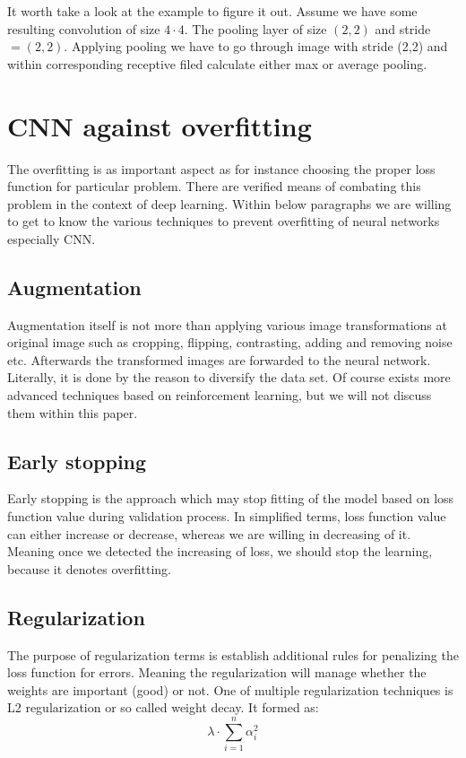 It worth take a look at the example to figure it out. Assume we have some resulting convolution of size $4 \cdot 4$. The pooling layer of size $(2, 2)$ and stride $ = (2, 2)$. 
Applying pooling we have to go through image with stride (2,2) and within corresponding receptive filed calculate either max or average pooling.  

\section{CNN against overfitting}
The overfitting is as important aspect as for instance choosing the proper loss function for particular problem. There are verified means of combating this problem in the context of deep learning. Within below paragraphs we are willing to get to know the various techniques to prevent overfitting of neural networks especially CNN. 

\subsection{Augmentation}
Augmentation itself is not more than applying various image transformations at original image such as cropping, flipping, contrasting, adding and removing noise etc. Afterwards the transformed images are forwarded to the neural network. Literally, it is done by the reason to diversify the data set. Of course exists more advanced techniques based on reinforcement learning, but we will not discuss them within this paper.      

\subsection{Early stopping}
Early stopping is the approach which may stop fitting of the model based on loss function value during validation process. In simplified terms, loss function value can either increase or decrease, whereas we are willing in decreasing of it. Meaning once we detected the increasing of loss, we should stop the learning, because it denotes overfitting.      

\subsection{Regularization}
The purpose of regularization terms is establish additional rules for penalizing the loss function for errors. Meaning the regularization will manage whether the weights are important (good) or not. One of multiple regularization techniques is L2 regularization or so called weight decay. It formed as:
\[ \lambda \cdot \sum_{i=1}^{n} \alpha_i^2 \]

